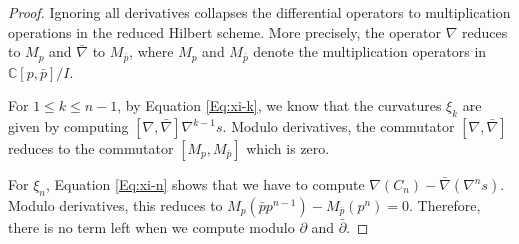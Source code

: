 \documentclass[11pt]{amsart}
\numberwithin{thm}{section} %
\numberwithin{equation}{section} %
\numberwithin{figure}{section} %
\newcommand*{\C}{\mathbb{C}}
\begin{document}
\begin{proof}
Ignoring all derivatives collapses the differential operators to multiplication operations in the reduced Hilbert scheme. More precisely, the operator $\nabla$ reduces to $M_p$ and $\bar\nabla$ to $M_{\bar p}$, where $M_p$ and $M_{\bar{p}}$ denote the multiplication operators in $\C[p,\bar{p}]/I$.

For $1\leq k\leq n-1$, by Equation \eqref{Eq:xi-k}, we know that the curvatures $\xi_k$ are given by computing $[\nabla,\bar\nabla]\nabla^{k-1}s$. Modulo derivatives, the commutator $[\nabla,\bar\nabla]$ reduces to the commutator $[M_p,M_{\bar p}]$ which is zero.

For $\xi_n$, Equation \eqref{Eq:xi-n} shows that we have to compute $\nabla(C_n)-\bar\nabla(\nabla^n s)$. Modulo derivatives, this reduces to $M_p(\bar{p} p^{n-1})-M_{\bar p}(p^n) = 0$.
Therefore, there is no term left when we compute modulo $\partial$ and $\bar\partial$.
\end{proof}
\end{document}
